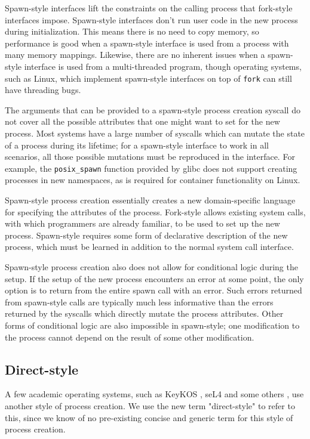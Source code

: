 \documentclass[letterpaper,twocolumn,10pt]{article}
\begin{document}
Spawn-style interfaces lift the constraints on the calling process that fork-style interfaces impose.
Spawn-style interfaces don't run user code in the new process during initialization.
This means there is no need to copy memory,
so performance is good when a spawn-style interface is used from a process with many memory mappings.
Likewise, there are no inherent issues when a spawn-style interface is used from a multi-threaded program,
though operating systems, such as Linux,
which implement spawn-style interfaces on top of \texttt{fork} can still have threading bugs.

The arguments that can be provided to a spawn-style process creation syscall
do not cover all the possible attributes that one might want to set for the new process.
Most systems have a large number of syscalls which can mutate the state of a process during its lifetime;
for a spawn-style interface to work in all scenarios,
all those possible mutations must be reproduced in the interface.
For example, the \texttt{posix\_spawn} function provided by glibc does not support creating processes in new namespaces,
as is required for container functionality on Linux.

Spawn-style process creation
essentially creates a new domain-specific language for specifying the attributes of the process.
Fork-style allows existing system calls,
with which programmers are already familiar,
to be used to set up the new process.
Spawn-style requires some form of declarative description of the new process,
which must be learned in addition to the normal system call interface.

Spawn-style process creation also does not allow for conditional logic during the setup.
If the setup of the new process encounters an error at some point,
the only option is to return from the entire spawn call with an error.
Such errors returned from spawn-style calls
are typically much less informative
than the errors returned by the syscalls which directly mutate the process attributes.
Other forms of conditional logic are also impossible in spawn-style;
one modification to the process cannot depend on the result of some other modification.
\subsection{Direct-style}
A few academic operating systems, such as KeyKOS \cite{keykos}, seL4 \cite{sel4}
and some others \cite{exokernel} \cite{fuschia} \cite{singularity},
use another style of process creation.
We use the new term "direct-style" to refer to this,
since we know of no pre-existing concise and generic term for this style of process creation.
\end{document}
